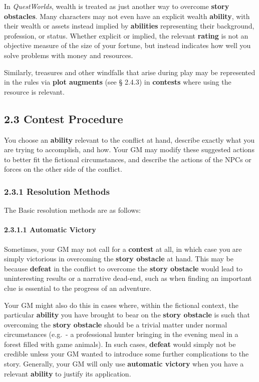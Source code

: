 \documentclass[
]{article}
\begin{document}
In \emph{QuestWorlds}, wealth is treated as just another way to overcome
\textbf{story obstacles}. Many characters may not even have an explicit
wealth \textbf{ability}, with their wealth or assets instead implied by
\textbf{abilities} representing their background, profession, or status.
Whether explicit or implied, the relevant \textbf{rating} is not an
objective measure of the size of your fortune, but instead indicates how
well you solve problems with money and resources.

Similarly, treasures and other windfalls that arise during play may be
represented in the rules via \textbf{plot augments} (see § 2.4.3) in
\textbf{contests} where using the resource is relevant.

\hypertarget{contest-procedure}{%
\subsection{2.3 Contest Procedure}\label{contest-procedure}}

You choose an \textbf{ability} relevant to the conflict at hand,
describe exactly what you are trying to accomplish, and how. Your GM may
modify these suggested actions to better fit the fictional
circumstances, and describe the actions of the NPCs or forces on the
other side of the conflict.

\hypertarget{resolution-methods}{%
\subsubsection{2.3.1 Resolution Methods}\label{resolution-methods}}

The Basic resolution methods are as follows:

\hypertarget{automatic-victory}{%
\paragraph{2.3.1.1 Automatic Victory}\label{automatic-victory}}

Sometimes, your GM may not call for a \textbf{contest} at all, in which
case you are simply victorious in overcoming the \textbf{story obstacle}
at hand. This may be because \textbf{defeat} in the conflict to overcome
the \textbf{story obstacle} would lead to uninteresting results or a
narrative dead-end, such as when finding an important clue is essential
to the progress of an adventure.

Your GM might also do this in cases where, within the fictional context,
the particular \textbf{ability} you have brought to bear on the
\textbf{story obstacle} is such that overcoming the \textbf{story
obstacle} should be a trivial matter under normal circumstances (e.g.~-
a professional hunter bringing in the evening meal in a forest filled
with game animals). In such cases, \textbf{defeat} would simply not be
credible unless your GM wanted to introduce some further complications
to the story. Generally, your GM will only use \textbf{automatic
victory} when you have a relevant \textbf{ability} to justify its
application.
\end{document}

